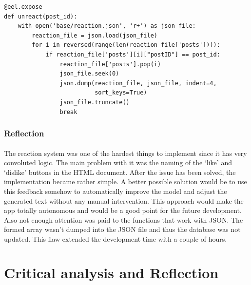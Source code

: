 \documentclass[12pt]{report}
\newenvironment{code}{\captionsetup{type=listing}}{}
\begin{document}
\clearpage

\begin{code}
\begin{verbatim}
@eel.expose
def unreact(post_id):
    with open('base/reaction.json', 'r+') as json_file:
        reaction_file = json.load(json_file)
        for i in reversed(range(len(reaction_file['posts']))):
            if reaction_file['posts'][i]["postID"] == post_id:
                reaction_file['posts'].pop(i)
                json_file.seek(0)
                json.dump(reaction_file, json_file, indent=4,
                          sort_keys=True)
                json_file.truncate()
                break
\end{verbatim}
\end{code}

\subsubsection*{Reflection}
\paragraph{}
The reaction system was one of the hardest things to implement since it has very convoluted logic. The main problem with
it was the naming of the `like' and `dislike' buttons in the HTML document. After the issue has been solved, the implementation
became rather simple. A better possible solution would be to use this feedback somehow to automatically improve
the model and adjust the generated text without any manual intervention. This approach would make the app 
totally autonomous and would be a good point for the future development. Also not enough attention was paid to the
functions that work with JSON. The formed array wasn't dumped into the JSON file and thus the database was not updated.
This flaw extended the development time with a couple of hours.

\clearpage

\section*{Critical analysis and Reflection}
\end{document}
